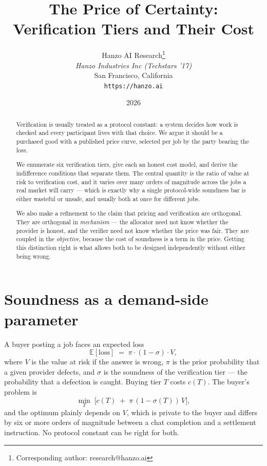 \documentclass[11pt,a4paper]{article}
\title{The Price of Certainty:\\Verification Tiers and Their Cost}
\author{
Hanzo AI Research\thanks{Corresponding author: research@hanzo.ai} \\
\textit{Hanzo Industries Inc (Techstars '17)} \\
San Francisco, California \\
\texttt{https://hanzo.ai}
}
\date{2026}
\begin{document}
\hanzocoverpage

\begin{abstract}
Verification is usually treated as a protocol constant: a system decides how
work is checked and every participant lives with that choice. We argue it should
be a purchased good with a published price curve, selected per job by the party
bearing the loss.

We enumerate six verification tiers, give each an honest cost model, and derive
the indifference conditions that separate them. The central quantity is the
ratio of value at risk to verification cost, and it varies over many orders of
magnitude across the jobs a real market will carry --- which is exactly why a
single protocol-wide soundness bar is either wasteful or unsafe, and usually
both at once for different jobs.

We also make a refinement to the claim that pricing and verification are
orthogonal. They are orthogonal in \emph{mechanism} --- the allocator need not
know whether the provider is honest, and the verifier need not know whether the
price was fair. They are coupled in the \emph{objective}, because the cost of
soundness is a term in the price. Getting this distinction right is what allows
both to be designed independently without either being wrong.
\end{abstract}

\tableofcontents
\newpage

\section{Soundness as a demand-side parameter}

A buyer posting a job faces an expected loss
\begin{equation}
\mathbb{E}[\text{loss}] \;=\; \pi \cdot (1 - \sigma) \cdot V,
\end{equation}
where $V$ is the value at risk if the answer is wrong, $\pi$ is the prior
probability that a given provider defects, and $\sigma$ is the soundness of the
verification tier --- the probability that a defection is caught. Buying tier
$T$ costs $c(T)$. The buyer's problem is
\begin{equation}
\min_{T} \; \Big[ c(T) \;+\; \pi\,(1-\sigma(T))\,V \Big],
\label{eq:tierchoice}
\end{equation}
and the optimum plainly depends on $V$, which is private to the buyer and
differs by six or more orders of magnitude between a chat completion and a
settlement instruction. No protocol constant can be right for both.
\end{document}
